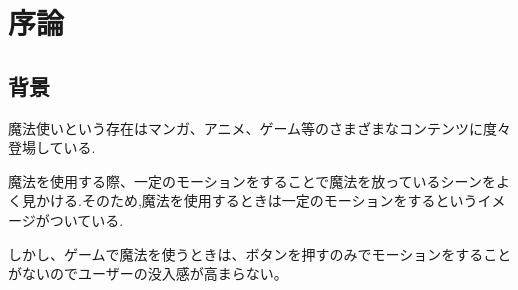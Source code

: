 \chapter{序論}
\section{背景}
魔法使いという存在はマンガ、アニメ、ゲーム等のさまざまなコンテンツに度々登場している.




魔法を使用する際、一定のモーションをすることで魔法を放っているシーンをよく見かける.そのため,魔法を使用するときは一定のモーションをするというイメージがついている.

しかし、ゲームで魔法を使うときは、ボタンを押すのみでモーションをすることがないのでユーザーの没入感が高まらない。



\begin{comment}
    \textblockcolour{pink}
    \begin{textblock}{4}(16, 1)
        \noindent
        【5】目次に続いて本文
    \end{textblock}
    
    \textblockcolour{PowderBlue}
    \begin{textblock}{12}(6, 6)
    \noindent
    以降、1章 (chapter)、1.1節 (section)、1.1.1項 (subsection) と呼ぶ
    \end{textblock}
    
    \begin{textblock}{6}(8, 12)
    1章の最初の節が1.1
    
    1.1節の最初の項が1.1.1
    \end{textblock}
    
    
    \begin{textblock}{2}(0.5, 13.5)
    \noindent
    段落1行目を字下げをする
    \end{textblock}
    
    \begin{textblock}{2}(0.5, 18)
    \noindent
    内容の区切りに合わせて段落を分ける
    \end{textblock}
    
    \begin{textblock}{6}(11, 26.5)
        本文の開始ページを1とする
    \end{textblock}
\end{comment}

